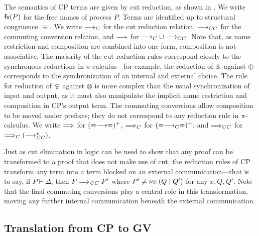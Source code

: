 \documentclass[oribibl,orivec,envcountsame]{llncs}
\begin{document}
The semantics of CP terms are given by cut reduction, as shown in .  We write
$\mathsf{fv}(P)$ for the free names of process $P$.  Terms are identified up to structural congruence
$\equiv$. We write $\longrightarrow_C$ for the cut reduction relation, $\longrightarrow_{CC}$ for the commuting conversion
relation, and $\longrightarrow$ for $\longrightarrow_C \cup \longrightarrow_{CC}$. Note that, as name restriction and composition are
combined into one form, composition is not associative. The majority of the cut reduction rules
correspond closely to the synchronous reductions in $\pi$-calculus---for example, the reduction of
$\mathbin\binampersand$ against $\oplus$ corresponds to the synchronization of an internal and external choice.  The
rule for reduction of $\mathbin\bindnasrepma$ against $\otimes$ is more complex than the usual synchronization of
input and output, as it must also manipulate the implicit name restriction and composition in CP's
output term. The commuting conversions allow composition to be moved under prefixes; they do not
correspond to any reduction rule in $\pi$-calculus. We write $\Longrightarrow$ for $(\equiv\longrightarrow\equiv)^+$,
$\Longrightarrow_C$ for $(\equiv\longrightarrow_C\equiv)^+$, and $\Longrightarrow_{CC}$ for $\Longrightarrow_C(\longrightarrow_{CC}^\star)$.

Just as cut elimination in logic can be used to show that any proof can be transformed to a proof
that does not make use of cut, the reduction rules of CP transform any term into a term blocked on
an external communication---that is to say, if $P \vdash \Delta$, then $P \Longrightarrow_{CC} P'$ where $P'
\not= \nu x \: (Q \mid Q')$ for any $x,Q,Q'$. Note that the final commuting conversions play a central
role in this transformation, moving any further internal communication beneath the external
communication.

\subsection{Translation from CP to GV}\label{sec:togv}
\end{document}
